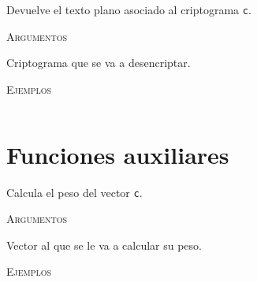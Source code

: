 \begin{description}[leftmargin=1em, font=\normalfont\ttfamily, style=nextline]
\begin{description}[font=\ttfamily, style=nextline]
        \item[decrypt(self, c)] Devuelve el texto plano asociado al criptograma \texttt{c}.

        \textsc{Argumentos}
        \begin{description}[font=\normalfont\ttfamily]
            \item[c] Criptograma que se va a desencriptar.
        \end{description}
        
        \textsc{Ejemplos}
        \begin{lstlisting}[gobble=4]
            % TODO
        \end{lstlisting}

    \end{description}
\end{description}

\section{Funciones auxiliares}

\begin{description}[leftmargin=1em, font=\normalfont\ttfamily, style=nextline]
    \item[get\_weight(c)]
  
    Calcula el peso del vector \texttt{c}.
  
    \textsc{Argumentos}
    \begin{description}[font=\normalfont\ttfamily]
        \item[c] Vector al que se le va a calcular su peso.
    \end{description}

    \textsc{Ejemplos}
    \begin{lstlisting}[gobble=4]
        % TODO
    \end{lstlisting}
\end{description}